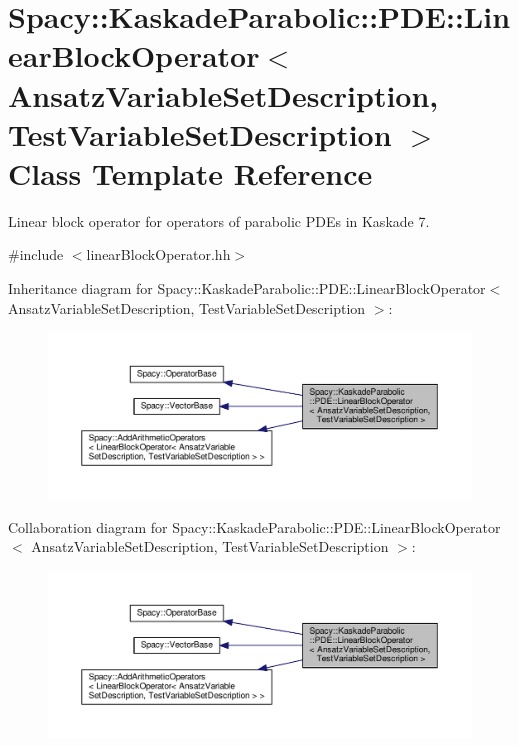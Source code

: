 \hypertarget{classSpacy_1_1KaskadeParabolic_1_1PDE_1_1LinearBlockOperator}{\section{Spacy\-:\-:Kaskade\-Parabolic\-:\-:P\-D\-E\-:\-:Linear\-Block\-Operator$<$ Ansatz\-Variable\-Set\-Description, Test\-Variable\-Set\-Description $>$ Class Template Reference}
\label{classSpacy_1_1KaskadeParabolic_1_1PDE_1_1LinearBlockOperator}
}


Linear block operator for operators of parabolic P\-D\-Es in Kaskade 7.  




{\ttfamily \#include $<$linear\-Block\-Operator.\-hh$>$}



Inheritance diagram for Spacy\-:\-:Kaskade\-Parabolic\-:\-:P\-D\-E\-:\-:Linear\-Block\-Operator$<$ Ansatz\-Variable\-Set\-Description, Test\-Variable\-Set\-Description $>$\-:
\nopagebreak
\begin{figure}[H]
\begin{center}
\leavevmode
\includegraphics[width=350pt]{classSpacy_1_1KaskadeParabolic_1_1PDE_1_1LinearBlockOperator__inherit__graph}
\end{center}
\end{figure}


Collaboration diagram for Spacy\-:\-:Kaskade\-Parabolic\-:\-:P\-D\-E\-:\-:Linear\-Block\-Operator$<$ Ansatz\-Variable\-Set\-Description, Test\-Variable\-Set\-Description $>$\-:
\nopagebreak
\begin{figure}[H]
\begin{center}
\leavevmode
\includegraphics[width=350pt]{classSpacy_1_1KaskadeParabolic_1_1PDE_1_1LinearBlockOperator__coll__graph}
\end{center}
\end{figure}
